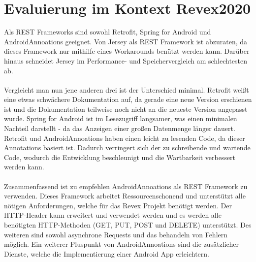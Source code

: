 \section{Evaluierung im Kontext Revex2020}
Als REST Frameworks sind sowohl Retrofit, Spring for Android und AndroidAnnoations geeignet. Von Jersey als REST Framework ist abzuraten, da dieses Framework nur mithilfe eines Workarounds benützt werden kann. Darüber hinaus schneidet Jersey im Performance- und Speichervergleich am schlechtesten ab.
\\\\
Vergleicht man nun jene anderen drei ist der Unterschied minimal. Retrofit weißt eine etwas schwächere Dokumentation auf, da gerade eine neue Version erschienen ist und die Dokumentation teilweise noch nicht an die neueste Version angepasst wurde. Spring for Android ist im Lesezugriff langsamer, was einen minimalen Nachteil darstellt - da das Anzeigen einer großen Datenmenge länger dauert. Retrofit und AndroidAnnoations haben einen leicht zu lesenden Code, da dieser Annotations basiert ist. Dadurch verringert sich der zu schreibende und wartende Code, wodurch die Entwicklung beschleunigt und die Wartbarkeit verbessert werden kann.
\\\\
Zusammenfassend ist zu empfehlen AndroidAnnoations als REST Framework zu verwenden. Dieses Framework arbeitet Ressourcenschonend und unterstützt alle nötigen Anforderungen, welche für das Revex Projekt benötigt werden. Der HTTP-Header kann erweitert und verwendet werden und es werden alle benötigten HTTP-Methoden (GET, PUT, POST und DELETE) unterstützt. Des weiteren sind sowohl asynchrone Requests und das behandeln von Fehlern möglich. Ein weiterer Pluspunkt von  AndroidAnnoations sind die zusätzlicher Dienste, welche die Implementierung einer Android App erleichtern.

